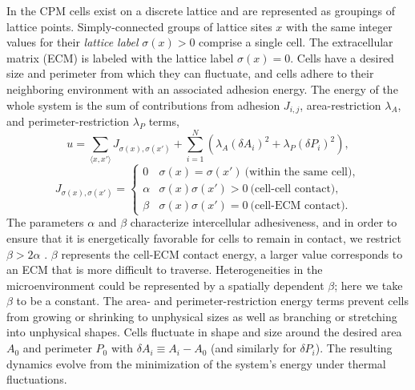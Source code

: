 In the CPM cells exist on a discrete lattice and are represented as groupings of lattice points. Simply-connected groups of lattice sites $x$ with the same integer values for their \textit{lattice label} $\sigma(x)>0$ comprise a single cell. The extracellular matrix (ECM) is labeled with the lattice label $\sigma(x)=0$. Cells have a desired size and perimeter from which they can fluctuate, and cells adhere to their neighboring environment with an associated adhesion energy. The energy of the whole system is the sum of contributions from adhesion $J_{i,j}$, area-restriction $\lambda_A$, and perimeter-restriction $\lambda_P$ terms,
\begin{equation}
    u = \sum_{\langle x,x' \rangle} J_{\sigma(x),\sigma(x')} + \sum_{i=1}^N \left( \lambda_A (\delta A_i)^2 + \lambda_P (\delta P_i)^2 \right),
\end{equation}
\begin{equation}
    J_{\sigma(x),\sigma(x')} =
    \begin{cases}
        0 &\sigma(x)=\sigma(x') \ \text{(within the same cell)}, \\
        \alpha &\sigma(x)\sigma(x')>0 \ \text{(cell-cell contact)}, \\
        \beta &\sigma(x)\sigma(x')=0 \ \text{(cell-ECM contact)}.
    \end{cases}
\end{equation}
The parameters $\alpha$ and $\beta$ characterize intercellular adhesiveness, and in order to ensure that it is energetically favorable for cells to remain in contact, we restrict $\beta > 2\alpha$ \cite{szabo2010collective}. $\beta$ represents the cell-ECM contact energy, a larger value corresponds to an ECM that is more difficult to traverse. Heterogeneities in the microenvironment could be represented by a spatially dependent $\beta$; here we take $\beta$ to be a constant. The area- and perimeter-restriction energy terms prevent cells from growing or shrinking to unphysical sizes as well as branching or stretching into unphysical shapes. Cells fluctuate in shape and size around the desired area $A_0$ and perimeter $P_0$ with $\delta A_i \equiv A_i-A_0$ (and similarly for $\delta P_i$). The resulting dynamics evolve from the minimization of the system's energy under thermal fluctuations.

